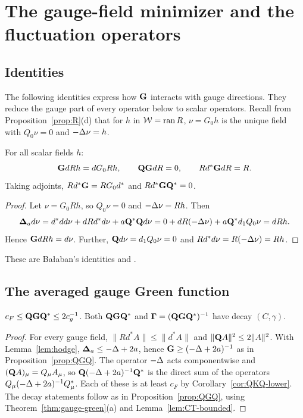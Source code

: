 \section{The gauge-field minimizer and the fluctuation operators}\label{sec:gauge-min}

\subsection{Identities}

The following identities express how $\mathbf G$ interacts with gauge directions. They reduce the gauge part of every operator below to scalar operators. Recall from Proposition~\ref{prop:R}(d) that for $h$ in $\mathcal W=\operatorname{ran} R$, $\nu=G_0h$ is the unique field with $Q_0\nu=0$ and $-\Delta\nu=h$.

\begin{proposition}\label{prop:gauge-identities}
For all scalar fields $h$:
\[
\mathbf G dRh=dG_0Rh,\qquad \mathbf Q\mathbf G dR=0,\qquad Rd^*\mathbf G dR=R .
\]
Taking adjoints, $Rd^*\mathbf G=RG_0d^*$ and $Rd^*\mathbf G\mathbf Q^*=0$.
\end{proposition}

\begin{proof}
Let $\nu=G_0Rh$, so $Q_0\nu=0$ and $-\Delta\nu=Rh$. Then
\[
\boldsymbol{\Delta}_a d\nu=d^*dd\nu+dRd^*d\nu+a\mathbf Q^*\mathbf Q d\nu=0+dR(-\Delta\nu)+a\mathbf Q^*d_1 Q_0\nu=dRh .
\]
Hence $\mathbf G dRh=d\nu$. Further, $\mathbf Q d\nu=d_1 Q_0\nu=0$ and $Rd^*d\nu=R(-\Delta\nu)=Rh$.
\end{proof}

These are Ba\l aban's identities \cite[(1.95), (1.97)]{BalPropI} and \cite[(3.152)]{BalBackground}.

\subsection{The averaged gauge Green function}

\begin{proposition}\label{prop:QGQ-gauge}
$c_F\le\mathbf Q\mathbf G\mathbf Q^*\le2c_g^{-1}$. Both $\mathbf Q\mathbf G\mathbf Q^*$ and $\boldsymbol\Gamma=(\mathbf Q\mathbf G\mathbf Q^*)^{-1}$ have decay $(C,\gamma)$.
\end{proposition}

\begin{proof}
For every gauge field, $\|Rd^*A\|\le\|d^*A\|$ and $\|\mathbf Q A\|^2\le2\|A\|^2$. With Lemma~\ref{lem:hodge}, $\boldsymbol{\Delta}_a\le-\Delta+2a$, hence $\mathbf G\ge(-\Delta+2a)^{-1}$ as in Proposition~\ref{prop:QGQ}. The operator $-\Delta$ acts componentwise and $(\mathbf Q A)_\mu=Q_\mu A_\mu$, so $\mathbf Q(-\Delta+2a)^{-1}\mathbf Q^*$ is the direct sum of the operators $Q_\mu(-\Delta+2a)^{-1}Q_\mu^*$. Each of these is at least $c_F$ by Corollary~\ref{cor:QKQ-lower}. The decay statements follow as in Proposition~\ref{prop:QGQ}, using Theorem~\ref{thm:gauge-green}(a) and Lemma~\ref{lem:CT-bounded}.
\end{proof}

